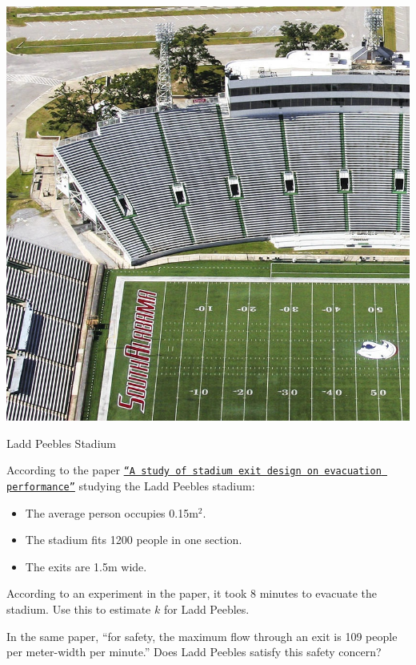 \documentclass{workbook}
\begin{document}
\begin{slide}

\question

\begin{center}
	\includegraphics[width=.4\textwidth]{images/Ladd_Stadium-cropped.jpg}
	
	Ladd Peebles Stadium
\end{center}

\begin{slidesonly}
	\bigskip
\end{slidesonly}

According to the paper \href{https://www.researchgate.net/publication/289492130_A_study_of_stadium_exit_design_on_evacuation_performance}{\tt ``A study of stadium exit design on evacuation performance''} studying the Ladd Peebles stadium:
\begin{itemize}
	\item The average person occupies 0.15m$^2$.
	\item The stadium fits 1200 people in one section.
	\item The exits are 1.5m wide.
\end{itemize}


\begin{parts}
	\item According to an experiment in the paper, it took 8 minutes to evacuate the stadium. Use this to estimate $k$ for Ladd Peebles.
	
	\item In the same paper, ``for safety, the maximum flow through an exit is 109 people per meter-width per minute.'' Does Ladd Peebles satisfy this safety concern?

\end{parts}

\end{slide}
\end{document}
